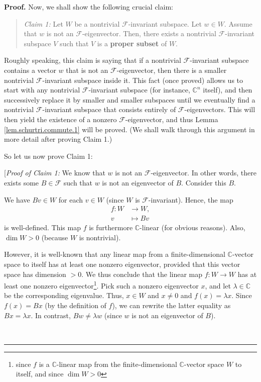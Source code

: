 \documentclass[numbers=enddot,12pt,final,onecolumn,notitlepage]{scrartcl}%
\numberwithin{exer}{subsection}
\theoremstyle{definition}
\newenvironment{statement}{\begin{quote}}{\end{quote}}
\newenvironment{proof}[1][Proof]{\noindent\textbf{#1.} }{\ \rule{0.5em}{0.5em}}
\begin{document}
\begin{proof}
Now, we shall show the following crucial claim:

\begin{statement}
\textit{Claim 1:} Let $W$ be a nontrivial $\mathcal{F}$-invariant subspace.
Let $w\in W$. Assume that $w$ is not an $\mathcal{F}$-eigenvector. Then, there
exists a nontrivial $\mathcal{F}$-invariant subspace $V$ such that $V$ is a
\textbf{proper subset} of $W$.
\end{statement}

Roughly speaking, this claim is saying that if a nontrivial $\mathcal{F}%
$-invariant subspace contains a vector $w$ that is not an $\mathcal{F}%
$-eigenvector, then there is a smaller nontrivial $\mathcal{F}$-invariant
subspace inside it. This fact (once proved) allows us to start with any
nontrivial $\mathcal{F}$-invariant subspace (for instance, $\mathbb{C}^{n}$
itself), and then successively replace it by smaller and smaller subspaces
until we eventually find a nontrivial $\mathcal{F}$-invariant subspace that
consists entirely of $\mathcal{F}$-eigenvectors. This will then yield the
existence of a nonzero $\mathcal{F}$-eigenvector, and thus Lemma
\ref{lem.schurtri.commute.1} will be proved. (We shall walk through this
argument in more detail after proving Claim 1.)

So let us now prove Claim 1:

[\textit{Proof of Claim 1:} We know that $w$ is not an $\mathcal{F}%
$-eigenvector. In other words, there exists some $B\in\mathcal{F}$ such that
$w$ is not an eigenvector of $B$. Consider this $B$.

We have $Bv\in W$ for each $v\in W$ (since $W$ is $\mathcal{F}$-invariant).
Hence, the map%
\begin{align*}
f:W  &  \rightarrow W,\\
v  &  \mapsto Bv
\end{align*}
is well-defined. This map $f$ is furthermore $\mathbb{C}$-linear (for obvious
reasons). Also, $\dim W>0$ (because $W$ is nontrivial).

However, it is well-known that any linear map from a finite-dimensional
$\mathbb{C}$-vector space to itself has at least one nonzero eigenvector,
provided that this vector space has dimension $>0$. We thus conclude that the
linear map $f:W\rightarrow W$ has at least one nonzero
eigenvector\footnote{since $f$ is a $\mathbb{C}$-linear map from the
finite-dimensional $\mathbb{C}$-vector space $W$ to itself, and since $\dim
W>0$}. Pick such a nonzero eigenvector $x$, and let $\lambda\in\mathbb{C}$ be
the corresponding eigenvalue. Thus, $x\in W$ and $x\neq0$ and $f\left(
x\right)  =\lambda x$. Since $f\left(  x\right)  =Bx$ (by the definition of
$f$), we can rewrite the latter equality as $Bx=\lambda x$. In contrast,
$Bw\neq\lambda w$ (since $w$ is not an eigenvector of $B$).


\end{proof}
\end{document}

